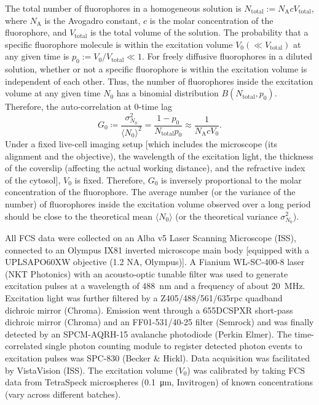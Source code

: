 The total number of fluorophores in a homogeneous solution is $N_\text{total} := N_\text{A}cV_\text{total}$, where $N_\text{A}$ is the Avogadro constant, $c$ is the molar concentration of the fluorophore, and $V_\text{total}$ is the total volume of the solution. The probability that a specific fluorophore molecule is within the excitation volume $V_0 (\ll V_\text{total})$ at any given time is $p_0 := V_0/V_\text{total}\ll1$. For freely diffusive fluorophores in a diluted solution, whether or not a specific fluorophore is within the excitation volume is independent of each other. Thus, the number of fluorophores inside the excitation volume at any given time $N_0$ has a binomial distribution $B(N_\text{total}, p_0)$. Therefore, the auto-correlation at 0-time lag
\begin{equation*}
    G_0 \coloneqq \dfrac{\sigma_{N_0}^2}{\langle N_0 \rangle^2} = \dfrac{1-p_0}{N_\text{total}p_0} \approx \dfrac{1}{N_\text{A}cV_0}.
\end{equation*}
Under a fixed live-cell imaging setup [which includes the microscope (its alignment and the objective), the wavelength of the excitation light, the thickness of the coverslip (affecting the actual working distance), and the refractive index of the cytosol], $V_0$ is fixed. Therefore, $G_0$ is inversely proportional to the molar concentration of the fluorophore. The average number (or the variance of the number) of fluorophores inside the excitation volume observed over a long period should be close to the theoretical mean $\langle N_0 \rangle$ (or the theoretical variance $\sigma_{N_0}^2$).

All FCS data were collected on an Alba v5 Laser Scanning Microscope (ISS), connected to an Olympus IX81 inverted microscope main body [equipped with a UPLSAPO60XW objective (1.2 NA, Olympus)]. A Fianium WL-SC-400-8 laser (NKT Photonics) with an acousto-optic tunable filter was used to generate excitation pulses at a wavelength of \SI{488}{nm} and a frequency of about \SI{20}{MHz}. Excitation light was further filtered by a Z405/488/561/635rpc quadband dichroic mirror (Chroma). Emission went through a 655DCSPXR short-pass dichroic mirror (Chroma) and an FF01-531/40-25 filter (Semrock) and was finally detected by an SPCM-AQRH-15 avalanche photodiode (Perkin Elmer). The time-correlated single photon counting module to register detected photon events to excitation pulses was SPC-830 (Becker \& Hickl). Data acquisition was facilitated by VistaVision (ISS). The excitation volume ($V_0$) was calibrated by taking FCS data from TetraSpeck\texttrademark{} microspheres (\SI{0.1}{\micro m}, Invitrogen) of known concentrations (vary across different batches).

